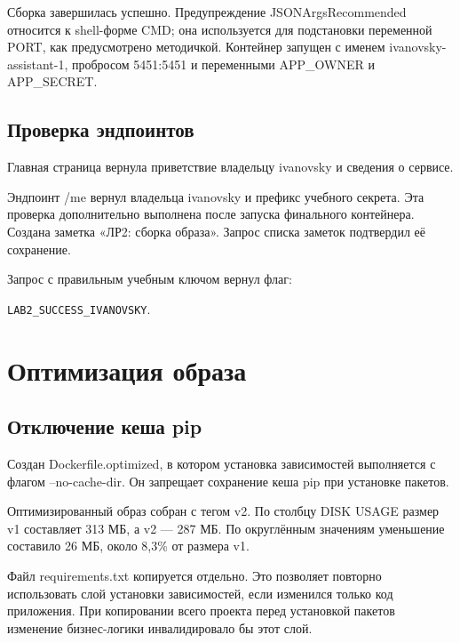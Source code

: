 Сборка завершилась успешно. Предупреждение JSONArgsRecommended относится к shell-форме CMD; она используется для подстановки переменной PORT, как предусмотрено методичкой.
Контейнер запущен с именем ivanovsky-assistant-1, пробросом 5451:5451 и переменными APP\_OWNER и APP\_SECRET.

\section{Проверка эндпоинтов}
Главная страница вернула приветствие владельцу ivanovsky и сведения о сервисе.

Эндпоинт /me вернул владельца ivanovsky и префикс учебного секрета. Эта проверка дополнительно выполнена после запуска финального контейнера.
Создана заметка «ЛР2: сборка образа». Запрос списка заметок подтвердил её сохранение.

Запрос с правильным учебным ключом вернул флаг:\par\noindent\texttt{LAB2\_SUCCESS\_IVANOVSKY}.

\chapter{Оптимизация образа}
\section{Отключение кеша pip}
Создан Dockerfile.optimized, в котором установка зависимостей выполняется с флагом --no-cache-dir. Он запрещает сохранение кеша pip при установке пакетов.

Оптимизированный образ собран с тегом v2. По столбцу DISK USAGE размер v1 составляет 313 МБ, а v2 --- 287 МБ. По округлённым значениям уменьшение составило 26 МБ, около 8,3\% от размера v1.

Файл requirements.txt копируется отдельно. Это позволяет повторно использовать слой установки зависимостей, если изменился только код приложения. При копировании всего проекта перед установкой пакетов изменение бизнес-логики инвалидировало бы этот слой.

